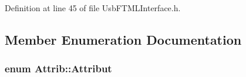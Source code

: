 Definition at line 45 of file UsbFTMLInterface.h.

\subsection{Member Enumeration Documentation}
\hypertarget{classAttrib_a69e171d7cc6417835a5a306d3c764235}{
\subsubsection[{Attribut}]{\setlength{\rightskip}{0pt plus 5cm}enum {\bf Attrib::Attribut}}}
\label{classAttrib_a69e171d7cc6417835a5a306d3c764235}
